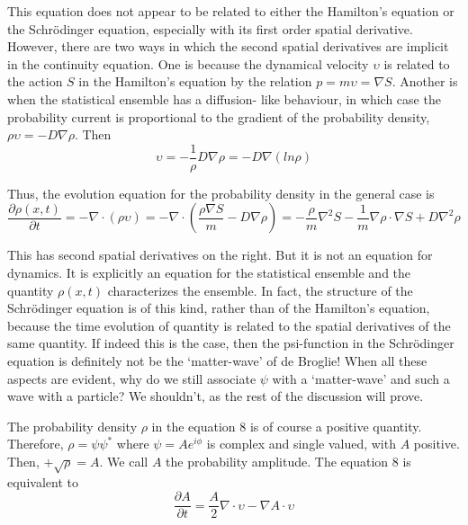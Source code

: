 This equation does not appear to be related to either the Hamilton's equation or the
Schr\"{o}dinger equation, especially with its first order spatial derivative. However, there are
two ways in which the second spatial derivatives are implicit in the continuity equation. One
is because the dynamical velocity $\upsilon$ is related to the action $S$ in the Hamilton's equation
by the relation $p = m \upsilon =\nabla S$. Another is when the statistical ensemble has a diffusion-
like behaviour, in which case the probability current is proportional to the gradient of the
probability density, $\rho \upsilon = - D \nabla \rho$. Then
\begin{equation*}
\upsilon = - \frac{1}{\rho} D \nabla \rho  = - D \nabla (l n \rho) \tag{9}
\end{equation*}


Thus, the evolution equation for the probability density in the general case is
\begin{equation*}
\frac{\partial \rho (x,t)}{\partial t} = - \nabla \cdot (\rho \upsilon) = - \nabla \cdot \left(\frac{\rho \nabla S}{m} - D \nabla \rho \right) = - \frac{\rho}{m} \nabla^2 S - \frac{1}{m} \nabla \rho \cdot \nabla S + D \nabla^2 \rho \tag{10} 
\end{equation*}

This has second spatial derivatives on the right. But it is not an equation for dynamics. It
is explicitly an equation for the statistical ensemble and the quantity $\rho (x, t)$ characterizes
the ensemble. In fact, the structure of the Schr\"{o}dinger equation is of this kind, rather than
of the Hamilton's equation, because the time evolution of quantity is related to the spatial
derivatives of the same quantity. If indeed this is the case, then the psi-function in the
Schr\"{o}dinger equation is definitely not be the `matter-wave' of de Broglie! When all these
aspects are evident, why do we still associate $\psi$ with a `matter-wave' and such a wave with a
particle? We shouldn't, as the rest of the discussion will prove.

The probability density $\rho$ in the equation 8 is of course a positive quantity. Therefore,
$\rho = \psi \psi^{\ast}$ where $\psi = Ae^{i\phi}$ is complex and single valued, with $A$ positive. Then, $+\sqrt{\rho} = A$.
We call $A$ the probability amplitude. The equation 8 is equivalent to
\begin{equation*}
\frac{\partial A}{\partial t} = \frac{A}{2} \nabla \cdot \upsilon - \nabla A \cdot \upsilon \tag{11}
\end{equation*}

